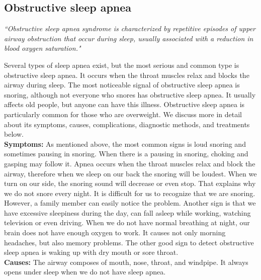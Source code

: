 \subsection{Obstructive sleep apnea}
    \textit{``Obstructive sleep apnea syndrome is characterized by repetitive episodes of upper airway obstruction that occur during sleep, usually associated with a reduction in blood oxygen saturation."}\citep{Westchester}
    
    Several types of sleep apnea exist, but the most serious and common type is obstructive sleep apnea. It occurs when the throat muscles relax and blocks the airway during sleep. The most noticeable signal of obstructive sleep apnea is snoring, although not everyone who snores has obstructive sleep apnea. It usually affects old people, but anyone can have this illness. Obstructive sleep apnea is particularly common for those who are overweight. We discuss more in detail about its symptoms, causes, complications, diagnostic methods, and treatments below.\\
    \textbf{Symptoms:} As mentioned above, the most common signs is loud snoring and sometimes pausing in snoring. When there is a pausing in snoring, choking and gasping may follow it. Apnea occurs when the throat muscles relax and block the airway, therefore when we sleep on our back the snoring will be loudest. When we turn on our side, the snoring sound will decrease or even stop. That explains why we do not snore every night. It is difficult for us to recognize that we are snoring. However, a family member can easily notice the problem. Another sign is that we have excessive sleepiness during the day, can fall asleep while working, watching television or even driving. When we do not have normal breathing at night, our brain does not have enough oxygen to work. It causes not only morning headaches, but also memory problems. The other good sign to detect obstructive sleep apnea is waking up with dry mouth or sore throat.\\
    \textbf{Causes:}
    The airway composes of mouth, nose, throat, and windpipe. It always opens under sleep when we do not have sleep apnea. 


